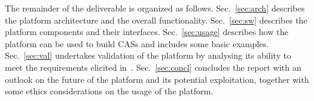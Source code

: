 
The remainder of the deliverable is organized as follows. Sec.~\ref{sec:arch} describes the platform architecture and the overall functionality. Sec.~\ref{sec:sw} describes the platform components and their interfaces. Sec.~\ref{sec:usage} describes how the platform can be used to build CASs and includes some basic examples. Sec.~\ref{sec:val} undertakes validation of the platform by analysing its ability to meet the requirements elicited in~\cite{D8.1}. Sec.~\ref{sec:concl} concludes the report with an outlook on the future of the platform and its potential exploitation, together with some ethics considerations on the usage of the platform.



